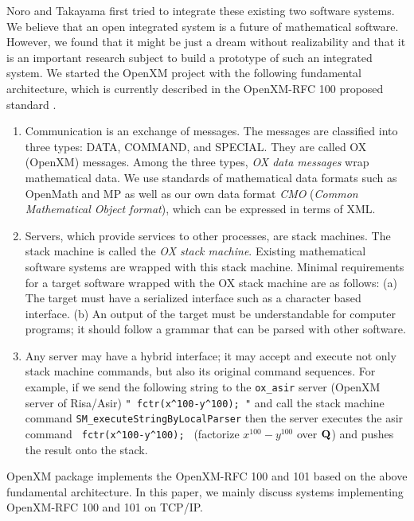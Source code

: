 Noro and Takayama first tried to integrate these existing two
software systems.
We believe that an open integrated system is a future of mathematical
software.
However, we found that it might be just a dream without realizability
and that it is an important research subject to
build a prototype of such an integrated system. %
We started the OpenXM project with the following
fundamental architecture, which is currently described in
the OpenXM-RFC 100  proposed standard %
\cite{ox-rfc-100}.
\begin{enumerate}
\item Communication is an exchange of messages. The messages are classified into
three types:
DATA, COMMAND, and SPECIAL.
They are called OX (OpenXM) messages.
Among the three types,
{\it OX data messages} wrap mathematical data.
We use standards of mathematical data formats such as OpenMath and MP
as well as our own data format {\it CMO}
({\it Common Mathematical Object format}),
which can be expressed in terms of XML.
\item Servers, which provide services to other processes, are stack machines.
The stack machine is called the
{\it OX stack machine}.
Existing mathematical software systems are wrapped with this stack machine.
Minimal requirements for a target software wrapped with the OX stack machine
are as follows:
(a) The target must have a serialized interface such as a character based
interface.
(b) An output of the target must be understandable for computer programs;
it should follow a grammar that can be parsed with other software.
\item Any server may have a hybrid interface;
it may accept and execute not only stack machine commands, 
but also its original command sequences.
For example,
if we send the following string to the {\tt ox\_asir} server 
(OpenXM server of Risa/Asir) 
\verb+" fctr(x^100-y^100); "+ 
and call the stack machine command 
\verb+SM_executeStringByLocalParser+
then the server executes the asir command 
\verb+ fctr(x^100-y^100); + 
(factorize $x^{100}-y^{100}$ over ${\bf Q}$)
and pushes the result onto the stack.
\end{enumerate}
OpenXM package  implements the OpenXM-RFC 100 \cite{ox-rfc-100}
and 101 \cite{ox-rfc-101} based on
the above fundamental architecture.
In this paper, we mainly discuss systems implementing
OpenXM-RFC 100 and 101 on TCP/IP.

